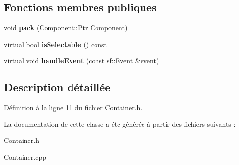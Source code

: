 \subsection*{Fonctions membres publiques}
\begin{DoxyCompactItemize}
\item 
\hypertarget{class_g_u_i_1_1_container_a6f6217ae300a4f313a55f01f17baf5d6}{}\label{class_g_u_i_1_1_container_a6f6217ae300a4f313a55f01f17baf5d6} 
void {\bfseries pack} (Component\+::\+Ptr \hyperlink{class_g_u_i_1_1_component}{Component})
\item 
\hypertarget{class_g_u_i_1_1_container_a6a5c4b42556336e194a90c68a035174d}{}\label{class_g_u_i_1_1_container_a6a5c4b42556336e194a90c68a035174d} 
virtual bool {\bfseries is\+Selectable} () const
\item 
\hypertarget{class_g_u_i_1_1_container_af08db9d157a4e56f706493529901eb7f}{}\label{class_g_u_i_1_1_container_af08db9d157a4e56f706493529901eb7f} 
virtual void {\bfseries handle\+Event} (const sf\+::\+Event \&event)
\end{DoxyCompactItemize}


\subsection{Description détaillée}


Définition à la ligne 11 du fichier Container.\+h.



La documentation de cette classe a été générée à partir des fichiers suivants \+:\begin{DoxyCompactItemize}
\item 
Container.\+h\item 
Container.\+cpp\end{DoxyCompactItemize}
